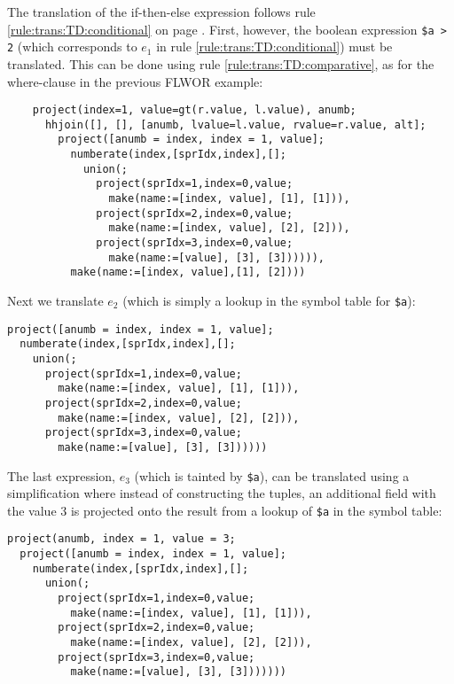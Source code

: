 
The translation of the if-then-else expression follows rule
\ref{rule:trans:TD:conditional}  on page \pageref{rule:trans:TD:conditional}.
First, however, the boolean expression \texttt{\$a > 2} (which corresponds to
$e_1$ in rule \ref{rule:trans:TD:conditional}) must be translated. This can be
done using rule \ref{rule:trans:TD:comparative}, as for the where-clause in the
previous FLWOR example:


\begin{Verbatim}
    project(index=1, value=gt(r.value, l.value), anumb;
      hhjoin([], [], [anumb, lvalue=l.value, rvalue=r.value, alt];
        project([anumb = index, index = 1, value];
          numberate(index,[sprIdx,index],[];
            union(;
              project(sprIdx=1,index=0,value;
                make(name:=[index, value], [1], [1])),
              project(sprIdx=2,index=0,value;
                make(name:=[index, value], [2], [2])),
              project(sprIdx=3,index=0,value;
                make(name:=[value], [3], [3]))))),
          make(name:=[index, value],[1], [2])))
\end{Verbatim}

Next we translate $e_2$ (which is simply a lookup in the symbol table for \texttt{\$a}):

\begin{Verbatim}
project([anumb = index, index = 1, value];
  numberate(index,[sprIdx,index],[];
    union(;
      project(sprIdx=1,index=0,value;
        make(name:=[index, value], [1], [1])),
      project(sprIdx=2,index=0,value;
        make(name:=[index, value], [2], [2])),
      project(sprIdx=3,index=0,value;
        make(name:=[value], [3], [3])))))
\end{Verbatim}

The last expression, $e_3$ (which is tainted by \texttt{\$a}), can be translated
using a simplification where instead of constructing the tuples, an additional
field with the value 3 is projected onto the result from a lookup of
\texttt{\$a} in the symbol table:

\begin{Verbatim}
project(anumb, index = 1, value = 3;
  project([anumb = index, index = 1, value];
    numberate(index,[sprIdx,index],[];
      union(;
        project(sprIdx=1,index=0,value;
          make(name:=[index, value], [1], [1])),
        project(sprIdx=2,index=0,value;
          make(name:=[index, value], [2], [2])),
        project(sprIdx=3,index=0,value;
          make(name:=[value], [3], [3]))))))
\end{Verbatim}

